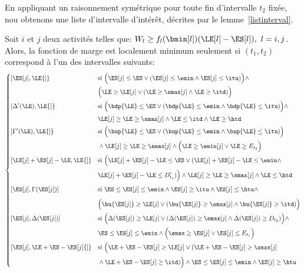 En appliquant un raisonnement symétrique pour toute fin d'intervalle
$t_2$ fixée, nou obtenons une liste d'intervalle d'intérêt, décrites
par le lemme~\ref{listinterval}.

\begin{lemma}
  \label{listinterval} 
Soit $i$ et $j$ deux activités telles que: $W_l\ge
f_l(\bmin[l])(\LE[l]-\ES[l]),\ l=i,j$. Alors, la fonction de marge est
localement minimum seulement si $(t_1,t_2)$ correspond à l'un des
intervalles suivants:
\[ \left\{
    \begin{aligned} 
      &{[}\ES[j],\LE{]} & & \text{si } \Big(\ES[j] \le \ES \lor (\ES[j]
      \le \emin \land \ES[j] \le \itu)\Big) \land \\*
      & & &\Big(\LE \ge \LE[j] \lor (\LE \ge \smax[j] \land \LE \ge \itd)\Big)\\
      \rule[-0.8em]{0pt}{2em}      
      &{[}\Delta'(\LE),\LE{]} & & \text{si } \Big(\bdp{\LE} \le \ES \lor
      (\bdp{\LE}\le \emin \land \bdp{\LE}\le \itu)\Big) \land \\*
      & & &\LE[j] \ge \LE \ge \smax[j] \land \LE \le \itd \land \LE \ge
      \htd\\
      \rule[-0.8em]{0pt}{2em}
      &{[}\Gamma'(\LE),\LE{]} & & \text{si } \Big(\bup{\LE} \le \ES \lor
      (\bup{\LE} \le \emin \land \bup{\LE} \le \itu)\Big) \\*
      & & &\land \LE[j] \ge \LE \ge \smax[j] \land \Big(\LE \ge \emin[j]
      \lor \LE \ge E_{t_2}\Big)\\
      \rule[-0.8em]{0pt}{2em}
      &{[}\LE[j]+\ES[j]-\LE,\LE{]} & & \text{si } \Big(\LE[j]+\ES[j]-\LE \le \ES \lor
      (\LE[j]+\ES[j]-\LE \le \emin \land \\*
      & & & \LE[j]+\ES[j]-\LE \le D'_{t_1})\Big) \land \LE[j] \ge \LE
      \ge \smax[j] \land \LE\le \htd\\ 
      \rule[-0.8em]{0pt}{2em}
      &{[}\ES[j],\Gamma(\ES[j]){]} & &\text{si } \ES \le \ES[j] \le \emin \land
      \ES[j] \ge \itu \land \ES[j] \le \htu \land \\* 
      & & &\Big(\bu{\ES[j]} \ge \LE[j] \lor (\bu{\ES[j]} \ge \smax[j] \land \bu{\ES[j]} \ge
      \itd)\Big)\\
      \rule[-0.8em]{0pt}{2em}
      &{[}\ES[j],\Delta(\ES[j]){]} & &\text{si } \Big(\Delta(\ES[j]) \ge \LE[j] \lor
      (\Delta(\ES[j]) \ge \smax[j] \land \Delta(\ES[j]) \ge D_{t_2})\Big) \land
      \\* 
      & & &\ES \le \ES[j] \le \emin \land \Big(\smax \ge \ES[j] \lor \ES[j] \le
      E_{t_1}\Big)\\
      \rule[-0.8em]{0pt}{2em}
      &{[}\ES[j],\LE+\ES-\ES[j]{]} & & \text{si } \Big(\LE+\ES-\ES[j] \ge \LE[j] \lor
      (\LE+\ES-\ES[j] \ge \smax[j] \\*
& & &\land \LE+\ES-\ES[j] \ge \itd)\Big) \land 
      \ES \le \ES[j] \le \emin \land \ES[j] \ge \htu
    \end{aligned} \right.
\]
\end{lemma}

